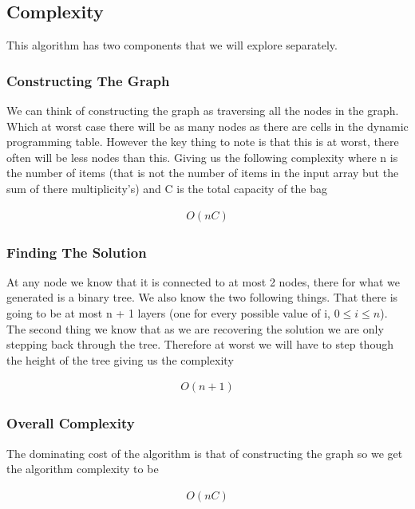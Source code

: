 \documentclass{article}
\begin{document}
		\subsection{Complexity}
			This algorithm has two components that we will explore separately.
			
			\subsubsection{Constructing The Graph}
				We can think of constructing the graph as traversing all the nodes in the graph. Which at worst case there will be as many nodes as there are cells in the dynamic programming table. However the key thing to note is that this is at worst, there often will be less nodes than this. Giving us the following complexity where n is the number of items (that is not the number of items in the input array but the sum of there multiplicity's) and C is the total capacity of the bag 
				
				\begin{align}
					O(nC)
				\end{align}										
				
			\subsubsection{Finding The Solution}
				At any node we know that it is connected to at most 2 nodes, there for what we generated is a binary tree. We also know the two following things. That there is going to be at most n + 1 layers (one for every possible value of i, $0 \leqslant i \leqslant n$). The second thing we know that as we are recovering the solution we are only stepping back through the tree. Therefore at worst we will have to step though the height of the tree giving us the complexity
				
				\begin{align}
					O(n+1)
				\end{align}
			
			\subsubsection{Overall Complexity}
				The dominating cost of the algorithm is that of constructing the graph so we get the algorithm complexity to be   
				
				\begin{align}
					O(nC)
				\end{align}	
				
\end{document}
